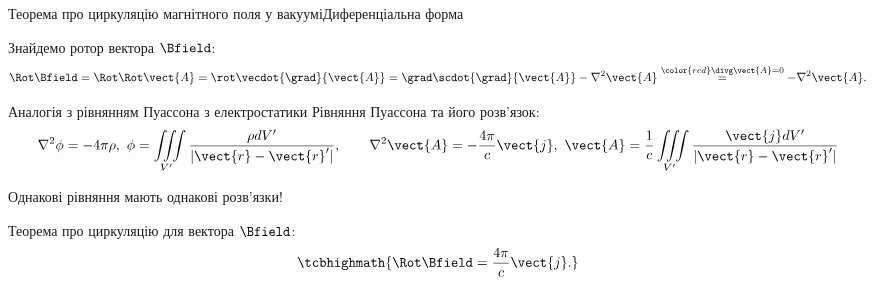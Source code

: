 \documentclass{beamer}
\begin{document}
\begin{frame}{Теорема про циркуляцію магнітного поля у вакуумі}{Диференціальна форма}
	\begin{block}{}
		Знайдемо ротор вектора $\Bfield$:
		\begin{equation*}
			\Rot\Bfield = \Rot\Rot\vect{A} = \rot\vecdot{\grad}{\vect{A}} =
			\grad\scdot{\grad}{\vect{A}} - \nabla^2\vect{A}
			\stackrel{\color{red}\divg\vect{A} = 0}{=} - \nabla^2\vect{A}.
		\end{equation*}
	\end{block}
	\begin{exampleblock}{\small Аналогія з рівнянням Пуассона з електростатики}\small
		Рівняння Пуассона та його розв'язок:
		\begin{equation*}
			\nabla^2\phi= -4\pi\rho,\ \phi = \iiint\limits_{V'} \frac{\rho dV'}{|\vect{r}
				- \vect{r}'|}, \qquad \nabla^2 \vect{A} = -\frac{4\pi}{c} \vect{j},\ \vect{A}
			= \frac1c\iiint\limits_{V'} \frac{\vect{j} dV'}{|\vect{r} - \vect{r}'|}
		\end{equation*}
		\begin{center}
			\alert{Однакові рівняння мають однакові розв'язки!}
		\end{center}
	\end{exampleblock}
	\begin{block}{}\centering
		Теорема про циркуляцію для вектора $\Bfield$:
		\begin{equation*}
			\tcbhighmath{\Rot\Bfield = \frac{4\pi}c\vect{j}.}
		\end{equation*}
	\end{block}
\end{frame}
\end{document}
